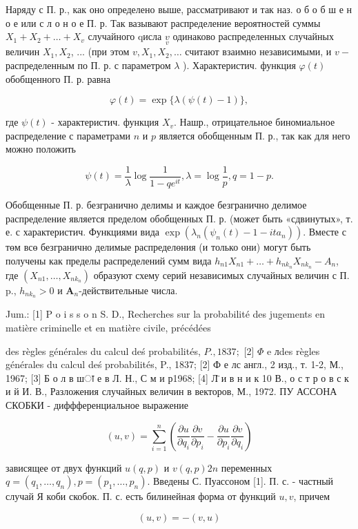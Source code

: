 \documentclass[10pt]{article}
\begin{document}
Наряду с П. р., как оно определено выше, рассматривают и так наз. о б о б ш е н о е или с л о н о е П. р. Так вазывают распределение вероятностей суммы $X_{1}+X_{2}+\ldots+X_{v}$ случайного qисла $\underset{v}{v}$ одинаково распределенных случайных величин $X_{1}, X_{2}$, ... (при этом $v, X_{1}, X_{2}, \ldots$ считают взаимно независимыми, и $v-$ распределенным по П. р. с параметром $\lambda$ ). Характеристич. функция $\varphi(t)$ обобщенного П. р. равна



\[

\varphi(t)=\exp \{\lambda(\psi(t)-1)\},

\]



где $\psi(t)$ - характеристич. функция $X_{v}$. Нашр., отрицательное биномиальное распределение с параметрами $n$ и $p$ является обобщенным П. р., так как для него можно положить



\[

\psi(t)=\frac{1}{\lambda} \log \frac{1}{1-q e^{i t}}, \lambda=\log \frac{1}{p}, q=1-p .

\]



Обобщенные П. р. безгранично делимы и каждое безгранично делимое распределение является пределом обобщенных П. р. (может быть «сдвинутых», т. е. с характеристич. Функциями вида $\exp \left(\lambda_{n}\left(\psi_{n}(t)-1-i t a_{n}\right)\right)$. Вместе с төм всө безгранично делимые распределөния (и только они) могут быть получены как пределы распределений сумм вида $h_{n 1} X_{n 1}+\ldots+h_{n k_{n}} X_{n k_{n}}-A_{n}$, где $\left(X_{n 1}, \ldots, X_{n k_{n}}\right)$ образуют схему серий независимых случайных величин с П. p., $h_{n k_{n}}>0$ и $\boldsymbol{A}_{n}$-действительные числа.



Jum.: [1] P o i s s o n S. D., Recherches sur la probabilité des jugements en matière criminelle et en matière civile, précédées

des règles générales du calcul deś probabilités, $P ., 1837 ;$ [2] $\Phi$ e лdes règles générales du calcul deś probabilités, P., 1837; [2] Ф е лс англ., 2 изд., т. 1-2, М., 1967; [3] Б о л в шा е в Л. Н., С м и р1968; [4] Л̈ и в н и к 10 В., о с т р о в с к и й И. В., Разложения случайных величин в векторов, М., 1972. ПУ АССОНА СКОБКИ - диффференциальное выражение



\[

(u, v)=\sum_{i=1}^{n}\left(\frac{\partial u}{\partial q_{i}} \frac{\partial v}{\partial p_{i}}-\frac{\partial u}{\partial p_{i}} \frac{\partial v}{\partial q_{i}}\right)

\]



зависящее от двух функций $u(q, p)$ и $v(q, p) 2 n$ переменных $q=\left(q_{1}, \ldots, q_{n}\right), p=\left(p_{1}, \ldots, p_{n}\right)$. Введены С. Пуассоном [1]. П. с. - частный случай Я коби скобок. П. с. есть билинейная форма от функций $u, v$, причем



\[

(u, v)=-(v, u)

\]
\end{document}
